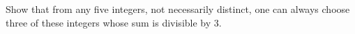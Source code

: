 Show that from any five integers, not necessarily distinct, one can always choose three of these integers whose sum is divisible by 3.
